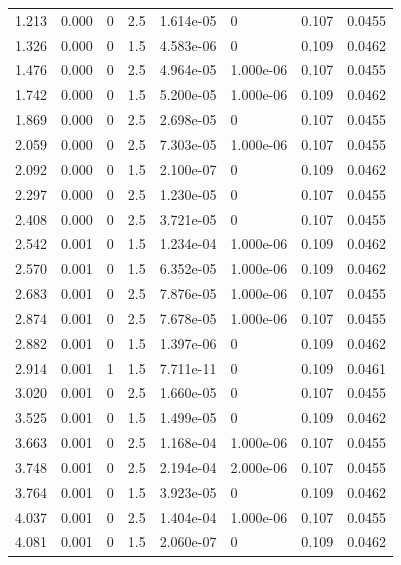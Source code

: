 \documentclass[preview]{standalone}
\begin{document}
{{\begin{tabular}{L{1.2cm}C{1.2cm} C{0.3cm}C{0.5cm} C{1.4cm}C{1.4cm} C{1.4cm}C{1.4cm}}
  1.213  &  0.000  & 0     & 2.5 &  1.614e-05  & 0  & 0.107 &  0.0455   \\ 
  1.326  &  0.000  & 0     & 1.5 &  4.583e-06  & 0  & 0.109 &  0.0462   \\ 
  1.476  &  0.000  & 0     & 2.5 &  4.964e-05  & 1.000e-06  & 0.107 &  0.0455   \\ 
  1.742  &  0.000  & 0     & 1.5 &  5.200e-05  & 1.000e-06  & 0.109 &  0.0462   \\ 
  1.869  &  0.000  & 0     & 2.5 &  2.698e-05  & 0  & 0.107 &  0.0455   \\ 
  2.059  &  0.000  & 0     & 2.5 &  7.303e-05  & 1.000e-06  & 0.107 &  0.0455   \\ 
  2.092  &  0.000  & 0     & 1.5 &  2.100e-07  & 0  & 0.109 &  0.0462   \\ 
  2.297  &  0.000  & 0     & 2.5 &  1.230e-05  & 0  & 0.107 &  0.0455   \\ 
  2.408  &  0.000  & 0     & 2.5 &  3.721e-05  & 0  & 0.107 &  0.0455   \\ 
  2.542  &  0.001  & 0     & 1.5 &  1.234e-04  & 1.000e-06  & 0.109 &  0.0462   \\ 
  2.570  &  0.001  & 0     & 1.5 &  6.352e-05  & 1.000e-06  & 0.109 &  0.0462   \\ 
  2.683  &  0.001  & 0     & 2.5 &  7.876e-05  & 1.000e-06  & 0.107 &  0.0455   \\ 
  2.874  &  0.001  & 0     & 2.5 &  7.678e-05  & 1.000e-06  & 0.107 &  0.0455   \\ 
  2.882  &  0.001  & 0     & 1.5 &  1.397e-06  & 0  & 0.109 &  0.0462   \\ 
  2.914  &  0.001  & 1     & 1.5 &  7.711e-11  & 0  & 0.109 &  0.0461   \\ 
  3.020  &  0.001  & 0     & 2.5 &  1.660e-05  & 0  & 0.107 &  0.0455   \\ 
  3.525  &  0.001  & 0     & 1.5 &  1.499e-05  & 0  & 0.109 &  0.0462   \\ 
  3.663  &  0.001  & 0     & 2.5 &  1.168e-04  & 1.000e-06  & 0.107 &  0.0455   \\ 
  3.748  &  0.001  & 0     & 2.5 &  2.194e-04  & 2.000e-06  & 0.107 &  0.0455   \\ 
  3.764  &  0.001  & 0     & 1.5 &  3.923e-05  & 0  & 0.109 &  0.0462   \\ 
  4.037  &  0.001  & 0     & 2.5 &  1.404e-04  & 1.000e-06  & 0.107 &  0.0455   \\ 
  4.081  &  0.001  & 0     & 1.5 &  2.060e-07  & 0  & 0.109 &  0.0462   \\ 

\end{tabular}}}
\end{document}
